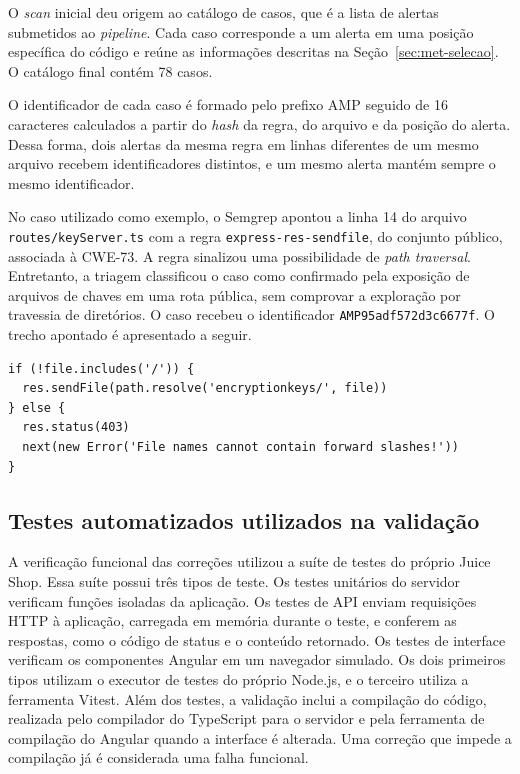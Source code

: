 O \textit{scan} inicial deu origem ao catálogo de casos, que é a lista de alertas submetidos ao \textit{pipeline}. Cada caso corresponde a um alerta em uma posição específica do código e reúne as informações descritas na Seção~\ref{sec:met-selecao}. O catálogo final contém 78 casos.

O identificador de cada caso é formado pelo prefixo AMP seguido de 16 caracteres calculados a partir do \textit{hash} da regra, do arquivo e da posição do alerta. Dessa forma, dois alertas da mesma regra em linhas diferentes de um mesmo arquivo recebem identificadores distintos, e um mesmo alerta mantém sempre o mesmo identificador.

No caso utilizado como exemplo, o Semgrep apontou a linha 14 do arquivo \texttt{routes/\allowbreak keyServer.\allowbreak ts} com a regra \texttt{express-res-sendfile}, do conjunto público, associada à CWE-73. A regra sinalizou uma possibilidade de \textit{path traversal}. Entretanto, a triagem classificou o caso como confirmado pela exposição de arquivos de chaves em uma rota pública, sem comprovar a exploração por travessia de diretórios. O caso recebeu o identificador \texttt{AMP95adf572d3c6677f}. O trecho apontado é apresentado a seguir.

{\footnotesize
\begin{verbatim}
if (!file.includes('/')) {
  res.sendFile(path.resolve('encryptionkeys/', file))
} else {
  res.status(403)
  next(new Error('File names cannot contain forward slashes!'))
}
\end{verbatim}
}

\subsection{Testes automatizados utilizados na validação}
\label{sec:impl-testes}

A verificação funcional das correções utilizou a suíte de testes do próprio Juice Shop. Essa suíte possui três tipos de teste. Os testes unitários do servidor verificam funções isoladas da aplicação. Os testes de API enviam requisições HTTP à aplicação, carregada em memória durante o teste, e conferem as respostas, como o código de status e o conteúdo retornado. Os testes de interface verificam os componentes Angular em um navegador simulado. Os dois primeiros tipos utilizam o executor de testes do próprio Node.js, e o terceiro utiliza a ferramenta Vitest. Além dos testes, a validação inclui a compilação do código, realizada pelo compilador do TypeScript para o servidor e pela ferramenta de compilação do Angular quando a interface é alterada. Uma correção que impede a compilação já é considerada uma falha funcional.

